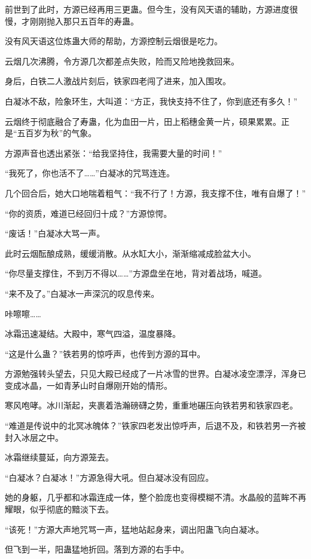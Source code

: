 \begin{this_body}
前世到了此时，方源已经再用三更蛊。但今生，没有风天语的辅助，方源进度很慢，才刚刚抛入那只五百年的寿蛊。

没有风天语这位炼蛊大师的帮助，方源控制云烟很是吃力。

云烟几次沸腾，令方源几次都差点失败，险而又险地挽救回来。

身后，白铁二人激战片刻后，铁家四老闯了进来，加入围攻。

白凝冰不敌，险象环生，大叫道：“方正，我快支持不住了，你到底还有多久！”

云烟终于彻底融合了寿蛊，化为血田一片，田上稻穗金黄一片，硕果累累。正是“五百岁为秋”的气象。

方源声音也透出紧张：“给我坚持住，我需要大量的时间！”

“我死了，你也活不了……”白凝冰的咒骂连连。

几个回合后，她大口地喘着粗气：“我不行了！方源，我支撑不住，唯有自爆了！”

“你的资质，难道已经回归十成？”方源惊愕。

“废话！”白凝冰大骂一声。

此时云烟酝酿成熟，缓缓消散。从水缸大小，渐渐缩减成脸盆大小。

“你尽量支撑住，不到万不得以……”方源盘坐在地，背对着战场，喊道。

“来不及了。”白凝冰一声深沉的叹息传来。

咔嚓嚓……

冰霜迅速凝结。大殿中，寒气四溢，温度暴降。

“这是什么蛊？”铁若男的惊呼声，也传到方源的耳中。

方源勉强转头望去，只见大殿已经成了一片冰雪的世界。白凝冰凌空漂浮，浑身已变成冰晶，一如青茅山时自爆刚开始的情形。

寒风咆哮。冰川渐起，夹裹着浩瀚磅礴之势，重重地碾压向铁若男和铁家四老。

“难道是传说中的北冥冰魄体？”铁家四老发出惊呼声，后退不及，和铁若男一齐被封入冰层之中。

冰霜继续蔓延，向方源笼去。

“白凝冰？白凝冰！”方源急得大吼。但白凝冰没有回应。

她的身躯，几乎都和冰霜连成一体，整个脸庞也变得模糊不清。水晶般的蓝眸不再耀眼，似乎彻底的黯淡下去。

“该死！”方源大声地咒骂一声，猛地站起身来，调出阳蛊飞向白凝冰。

但飞到一半，阳蛊猛地折回。落到方源的右手中。


\end{this_body}
